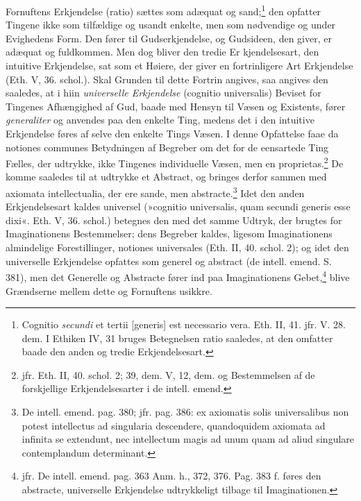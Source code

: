 \documentclass[12pt,a4paper]{book}
\newcommand{\opage}[1]{\marginnote{\footnotesize\textit{[#1]}}}
\begin{document}
Fornuftens Erkjendelse (ratio) sættes som adæquat og
sand;\footnote{Cognitio \emph{secundi} et tertii [generis] est
necessario vera. Eth. II, 41. jfr. V. 28. dem. I Ethiken IV, 31
bruges Betegnelsen ratio saaledes, at den omfatter baade den anden
og tredie Erkjendelsesart.} den opfatter Tingene ikke som tilfældige
og usandt enkelte, men som nødvendige og under Evighedens Form. Den
fører til Gudserkjendelse, og Gudsideen, den giver, er adæquat og
fuldkommen. Men dog bliver den tredie Er\-%
\opage{101}\setcounter{footnote}{0}%
kjendelsesart, den intuitive Erkjendelse, sat som et Høiere, der
giver en fortrinligere Art Erkjendelse (Eth. V, 36. schol.). Skal
Grunden til dette Fortrin angives, saa angives den saaledes, at i
hiin \emph{universelle Erkjendelse} (cognitio universalis) Beviset for
Tingenes Afhængighed af Gud, baade med Hensyn til Væsen og
Existents, fører \emph{generaliter} og anvendes paa den enkelte
Ting, medens det i den intuitive Erkjendelse føres af selve den
enkelte Tings Væsen. I denne Opfattelse faae da notiones communes
Betydningen af Begreber om det for de eensartede Ting Fælles, der
udtrykke, ikke Tingenes individuelle Væsen, men en
proprietas.\footnote{jfr. Eth. II, 40. schol. 2; 39, dem. V, 12,
dem. og Bestemmelsen af de forskjellige Erkjendelsesarter i de
intell. emend.} De komme saaledes til at udtrykke et Abstract, og
bringes derfor sammen med axiomata intellectualia, der ere sande,
men abstracte.\footnote{De intell. emend. pag. 380; jfr. pag. 386:
ex axiomatis solis universalibus non potest intellectus ad
singularia descendere, quandoquidem axiomata ad infinita se
extendunt, nec intellectum magis ad unum quam ad aliud singulare
contemplandum determinant.} Idet den anden Erkjendelsesart kaldes
universel (»cognitio universalis, quam secundi generis esse dixi«.
Eth. V, 36. schol.) betegnes den med det samme Udtryk, der brugtes
for Imaginationens Bestemmelser; dens Begreber kaldes, ligesom
Imaginationens almindelige Forestillinger, notiones universales
(Eth. II, 40. schol. 2); og idet den universelle Erkjendelse
opfattes som generel og abstract (de intell. emend. S. 381), men det
Generelle og Abstracte fører ind paa Imaginationens
Gebet,\footnote{jfr. De intell. emend. pag. 363 Anm. h., 372, 376.
Pag. 383 f. føres den abstracte, universelle Erkjendelse
udtrykkeligt tilbage til Imaginationen.} blive Grændserne mellem
dette og Fornuftens usikkre.
\end{document}
